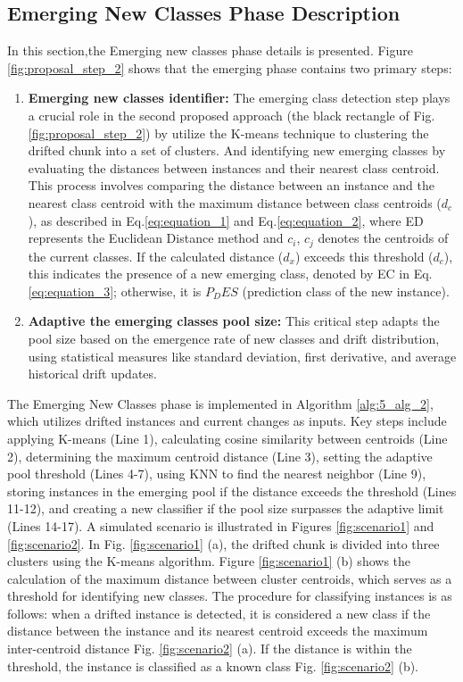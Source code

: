 \subsection{Emerging New Classes Phase Description}
\label{sec:emerging_phase}
In this section,the Emerging new classes phase details is presented. Figure \ref{fig:proposal_step_2} shows that the emerging phase contains two primary steps:
\begin{enumerate}
	\item \textbf{Emerging new classes identifier:} The emerging class detection step plays a crucial role in the second proposed approach (the black rectangle of Fig. \ref{fig:proposal_step_2}) by utilize the K-means technique to clustering the drifted chunk into a set of clusters. And identifying new emerging classes by evaluating the distances between instances and their nearest class centroid. This process involves comparing the distance between an instance and the nearest class centroid with the maximum distance between class centroids ($d_c$), as described in Eq.\ref{eq:equation_1} and Eq.\ref{eq:equation_2}, where ED represents the Euclidean Distance method and $c_i$, $c_j$ denotes the centroids of the current classes. If the calculated distance ($d_x$) exceeds this threshold ($d_c$), this indicates the presence of a new emerging class, denoted by EC in Eq. \ref{eq:equation_3}; otherwise, it is $P_DES$ (prediction class of the new instance).
	\item \textbf{Adaptive the emerging classes pool size:} This critical step adapts the pool size based on the emergence rate of new classes and drift distribution, using statistical measures like standard deviation, first derivative, and average historical drift updates.
\end{enumerate}
The Emerging New Classes phase is implemented in Algorithm \ref{alg:5_alg_2}, which utilizes drifted instances and current changes as inputs. Key steps include applying K-means (Line 1), calculating cosine similarity between centroids (Line 2), determining the maximum centroid distance (Line 3), setting the adaptive pool threshold (Lines 4-7), using KNN to find the nearest neighbor (Line 9), storing instances in the emerging pool if the distance exceeds the threshold (Lines 11-12), and creating a new classifier if the pool size surpasses the adaptive limit (Lines 14-17). A simulated scenario is illustrated in Figures  \ref{fig:scenario1} and  \ref{fig:scenario2}. In Fig. \ref{fig:scenario1} (a), the drifted chunk is divided into three clusters using the K-means algorithm. Figure \ref{fig:scenario1} (b) shows the calculation of the maximum distance between cluster centroids, which serves as a threshold for identifying new classes. The procedure for classifying instances is as follows: when a drifted instance is detected, it is considered a new class if the distance between the instance and its nearest centroid exceeds the maximum inter-centroid distance Fig. \ref{fig:scenario2} (a). If the distance is within the threshold, the instance is classified as a known class Fig. \ref{fig:scenario2} (b).


